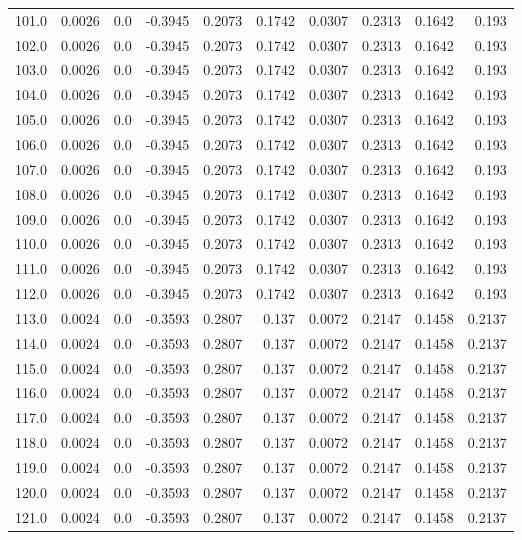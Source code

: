 \begin{longtable}{lrrrrrrrrr}
101.0 & 0.0026 & 0.0 & -0.3945 & 0.2073 & 0.1742 & 0.0307 & 0.2313 & 0.1642 & 0.193 \\
102.0 & 0.0026 & 0.0 & -0.3945 & 0.2073 & 0.1742 & 0.0307 & 0.2313 & 0.1642 & 0.193 \\
103.0 & 0.0026 & 0.0 & -0.3945 & 0.2073 & 0.1742 & 0.0307 & 0.2313 & 0.1642 & 0.193 \\
104.0 & 0.0026 & 0.0 & -0.3945 & 0.2073 & 0.1742 & 0.0307 & 0.2313 & 0.1642 & 0.193 \\
105.0 & 0.0026 & 0.0 & -0.3945 & 0.2073 & 0.1742 & 0.0307 & 0.2313 & 0.1642 & 0.193 \\
106.0 & 0.0026 & 0.0 & -0.3945 & 0.2073 & 0.1742 & 0.0307 & 0.2313 & 0.1642 & 0.193 \\
107.0 & 0.0026 & 0.0 & -0.3945 & 0.2073 & 0.1742 & 0.0307 & 0.2313 & 0.1642 & 0.193 \\
108.0 & 0.0026 & 0.0 & -0.3945 & 0.2073 & 0.1742 & 0.0307 & 0.2313 & 0.1642 & 0.193 \\
109.0 & 0.0026 & 0.0 & -0.3945 & 0.2073 & 0.1742 & 0.0307 & 0.2313 & 0.1642 & 0.193 \\
110.0 & 0.0026 & 0.0 & -0.3945 & 0.2073 & 0.1742 & 0.0307 & 0.2313 & 0.1642 & 0.193 \\
111.0 & 0.0026 & 0.0 & -0.3945 & 0.2073 & 0.1742 & 0.0307 & 0.2313 & 0.1642 & 0.193 \\
112.0 & 0.0026 & 0.0 & -0.3945 & 0.2073 & 0.1742 & 0.0307 & 0.2313 & 0.1642 & 0.193 \\
113.0 & 0.0024 & 0.0 & -0.3593 & 0.2807 & 0.137 & 0.0072 & 0.2147 & 0.1458 & 0.2137 \\
114.0 & 0.0024 & 0.0 & -0.3593 & 0.2807 & 0.137 & 0.0072 & 0.2147 & 0.1458 & 0.2137 \\
115.0 & 0.0024 & 0.0 & -0.3593 & 0.2807 & 0.137 & 0.0072 & 0.2147 & 0.1458 & 0.2137 \\
116.0 & 0.0024 & 0.0 & -0.3593 & 0.2807 & 0.137 & 0.0072 & 0.2147 & 0.1458 & 0.2137 \\
117.0 & 0.0024 & 0.0 & -0.3593 & 0.2807 & 0.137 & 0.0072 & 0.2147 & 0.1458 & 0.2137 \\
118.0 & 0.0024 & 0.0 & -0.3593 & 0.2807 & 0.137 & 0.0072 & 0.2147 & 0.1458 & 0.2137 \\
119.0 & 0.0024 & 0.0 & -0.3593 & 0.2807 & 0.137 & 0.0072 & 0.2147 & 0.1458 & 0.2137 \\
120.0 & 0.0024 & 0.0 & -0.3593 & 0.2807 & 0.137 & 0.0072 & 0.2147 & 0.1458 & 0.2137 \\
121.0 & 0.0024 & 0.0 & -0.3593 & 0.2807 & 0.137 & 0.0072 & 0.2147 & 0.1458 & 0.2137 \\

\end{longtable}
